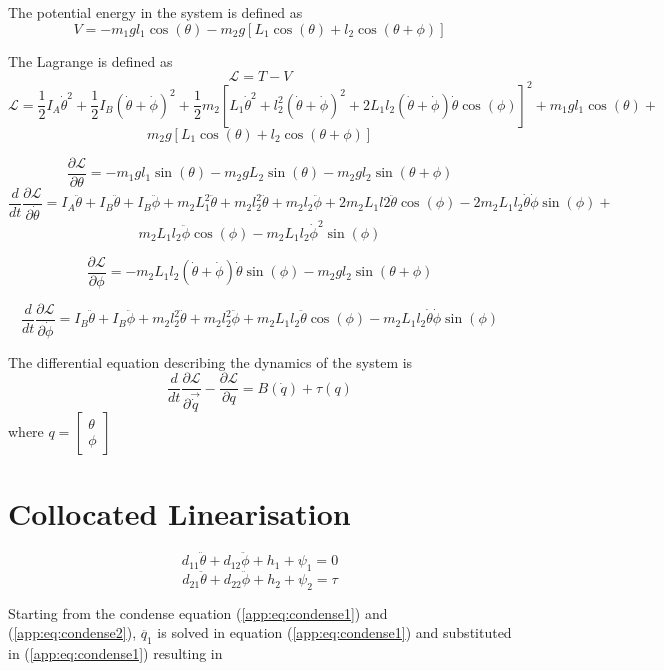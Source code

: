 The potential energy in the system is defined as
$$V=-m_{1}gl_{1}\cos(\theta)-m_{2}g[L_{1}\cos(\theta)+l_{2}\cos(\theta+\phi)]$$

The Lagrange is defined as 
$$\mathcal{L}=T-V$$
$$\mathcal{L} = \frac{1}{2}I_{A}\dot{\theta}^2 + \frac{1}{2}I_{B}(\dot{\theta}+\dot{\phi})^2 + \frac{1}{2}m_{2}[L_{1}\dot{\theta}^2+l_{2}^2(\dot{\theta}+\dot{\phi})^2 + 
2L_{1}l_{2}(\dot{\theta}+\dot{\phi})\dot{\theta}\cos(\phi)]^2+m_{1}gl_{1}\cos(\theta)+$$
$$m_{2}g[L_{1}\cos(\theta)+l_{2}\cos(\theta+\phi)]$$

$$\frac{\partial\mathcal{L}}{\partial\theta} = -m_{1}gl_{1}\sin(\theta)-m_{2}gL_{2}\sin(\theta)-m_{2}gl_{2}\sin(\theta+\phi)$$
$$\frac{d}{dt}\frac{\partial\mathcal{L}}{\partial\dot{\theta}} = I_{A}\ddot{\theta}+I_{B}\ddot{\theta}+I_{B}\ddot{\phi}+m_{2}L_{1}^2\ddot{\theta}+m_{2}l_{2}^2\ddot{\theta}+m_{2}l_{2}\ddot{\phi}+2m_{2}L_{1}l{2}\ddot{\theta}\cos(\phi)-2m_{2}L_{1}l_{2}\dot{\theta}\dot{\phi}\sin(\phi)+$$
$$m_{2}L_{1}l_{2}\ddot{\phi}\cos(\phi)-m_{2}L_{1}l_{2}\dot{\phi}^2\sin(\phi)$$


$$\frac{\partial\mathcal{L}}{\partial\phi} = -m_{2}L_{1}l_{2}(\dot{\theta}+\dot{\phi})\dot{\theta}\sin(\phi)-m_{2}gl_{2}\sin(\theta+\phi)$$

$$\frac{d}{dt}\frac{\partial\mathcal{L}}{\partial\dot{\phi}}=I_{B}\ddot{\theta}+I_{B}\ddot{\phi}+m_{2}l_{2}^2\ddot{\theta}+m_{2}l_{2}^2\ddot{\phi}+m_{2}L_{1}l_{2}\ddot{\theta}\cos(\phi)-m_{2}L_{1}l_{2}\dot{\theta}\dot{\phi}\sin(\phi)$$

The differential equation describing the dynamics of the system is
$$\frac{d}{dt}\frac{\partial\mathcal{L}}{\partial\vec{\dot{q}}}-\frac{\partial\mathcal{L}}{\partial q} = B(\dot{q})+\tau(q)$$ 
where  $ q = 
\begin{bmatrix}
\theta \\
\phi
\end{bmatrix}
$
\section{Collocated Linearisation}
\begin{equation} \label{app:eq:condense1}
d_{11}\ddot{\theta}+d_{12}\ddot{\phi} + h_{1} + \psi_{1} = 0
\end{equation}
\begin{equation} \label{app:eq:condense2}
d_{21}\ddot{\theta} + d_{22}\ddot{\phi} + h_{2} + \psi_{2} = \tau
\end{equation}

Starting from the condense equation (\ref{app:eq:condense1}) and (\ref{app:eq:condense2}), $\ddot{q_{1}}$ is solved in equation (\ref{app:eq:condense1}) and substituted in (\ref{app:eq:condense1}) resulting in 

